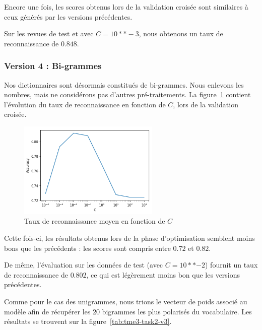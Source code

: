 \documentclass[a4paper]{article}
\newcommand{\figref}[1]{figure~\ref{#1}}
\begin{document}
Encore une fois, les scores obtenus lors de la validation croisée sont
similaires à ceux générés par les versions précédentes.

Sur les revues de test et avec $C=10**-3$, nous obtenons un taux de
reconnaissance de $0.848$.

\subsubsection{Version 4 : Bi-grammes}

Nos dictionnaires sont désormais constitués de bi-grammes. Nous enlevons les
nombres, mais ne considérons pas d'autres pré-traitements. La
\figref{img:tme2-task2-v3} contient l'évolution du taux de reconnaissance
en fonction de $C$, lors de la validation croisée.

\begin{figure}[H]
	\center 
	\includegraphics[width=0.6\textwidth]{images/tme2/task2_v3.png}
    \caption{Taux de reconnaissance moyen en fonction de $C$}
    \label{img:tme2-task2-v3}
\end{figure}

Cette fois-ci, les résultats obtenus lors de la phase d'optimisation semblent
moins bons que les précédents : les scores sont compris entre $0.72$ et $0.82$.

De même, l'évaluation sur les données de test (avec $C=10**{-2}$) fournit un
taux de reconnaissance de $0.802$, ce qui est légèrement moins bon que les
versions précédentes. 

Comme pour le cas des unigrammes, nous trions le vecteur de poids associé au
modèle afin de récupérer les $20$ bigrammes les plus polarisés du vocabulaire.
Les résultats se trouvent sur la \figref{tab:tme3-task2-v3}.

\begin{table}[H]
\centering
{}
\caption{20 bigrammes les plus polarisés}
\label{tab:tme3-task2-v3-w}
\end{table}
\end{document}
